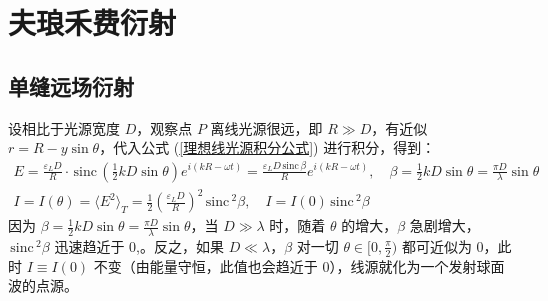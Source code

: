 \documentclass[UTF8]{report}
\def\sinc{\mathrm{\,sinc}\,}
\theoremstyle{MyLineTheoremStyle} %
\theoremstyle{MyBlockTheoremStyle} %
\theoremstyle{MySubsubsectionStyle} %
\begin{document}
\section{夫琅禾费衍射}

\subsection{单缝远场衍射}

设相比于光源宽度 $D$，观察点 $P$ 离线光源很远，即 $R \gg D$，有近似 $r = R - y\sin \theta$，代入公式 (\ref{理想线光源积分公式}) 进行积分，得到：
\begin{gather}
E = \frac{\varepsilon_L D}{R}\cdot \sinc \left(\frac{1}{2}kD \sin \theta\right) e^{i\left(kR - \omega t\right)}
= \frac{\varepsilon_L D \sinc \beta}{R}  e^{i\left(kR - \omega t\right)},\quad \beta = \frac{1}{2}kD \sin \theta = \frac{\pi D}{\lambda} \sin \theta\\ 
I = I(\theta)= \langle E^2  \rangle_T = \frac{1}{2}\left(\frac{\varepsilon_LD}{R}\right)^2 \sinc^2 \beta,\quad I = I(0) \sinc^2 \beta
\end{gather}
因为 $\beta = \frac{1}{2}kD \sin \theta = \frac{\pi D}{\lambda} \sin \theta $，当 $D \gg \lambda$ 时，随着 $\theta$ 的增大，$\beta$ 急剧增大，$\sinc^2 \beta$ 迅速趋近于 0,。反之，如果 $D \ll \lambda$，$\beta$ 对一切 $\theta \in [0, \frac{\pi}{2})$ 都可近似为 0，此时 $I \equiv I(0)$ 不变（由能量守恒，此值也会趋近于 0），线源就化为一个发射球面波的点源。
\end{document}
